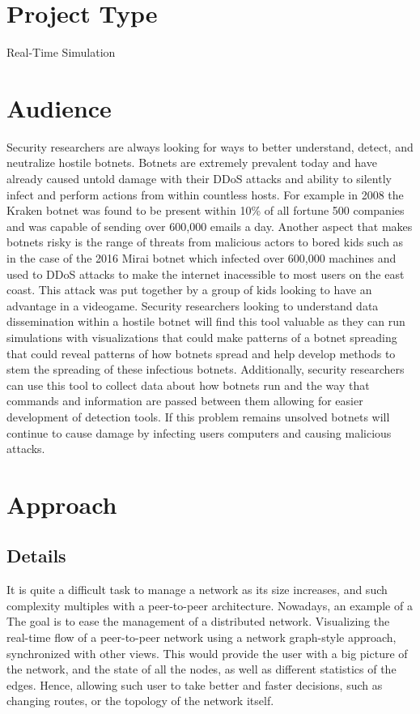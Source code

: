\documentclass{proc}
\begin{document}
\section{Project Type}
Real-Time Simulation
\section{Audience} 
Security researchers are always looking for ways to better understand, detect, and neutralize hostile botnets. Botnets are extremely prevalent today and have already caused untold damage with their DDoS attacks and ability to silently infect and perform actions from within countless hosts. For example in 2008 the Kraken botnet was found to be present within 10\% of all fortune 500 companies and was capable of sending over 600,000 emails a day. Another aspect that makes botnets risky is the range of threats from malicious actors to bored kids such as in the case of the 2016 Mirai botnet which infected over 600,000 machines and used to DDoS attacks to make the internet inacessible to most users on the east coast. This attack was put together by a group of kids looking to have an advantage in a videogame\cite{WhiteOps}. Security researchers looking to understand data dissemination within a hostile botnet will find this tool valuable as they can run simulations with visualizations that could make patterns of a botnet spreading that could reveal patterns of how botnets spread and help develop methods to stem the spreading of these infectious botnets. Additionally, security researchers can use this tool to collect data about how botnets run and  the way that commands and information are passed between them allowing for easier development of detection tools. If this problem remains unsolved botnets will continue to cause damage by infecting users computers and causing malicious attacks.

\section{Approach}
\subsection{Details}

It is quite a difficult task to manage a network as its size increases, and such complexity multiples with a peer-to-peer architecture. Nowadays, an example of a The goal is to ease the management of a distributed network. Visualizing the real-time flow of a peer-to-peer network using a network graph-style approach, synchronized with other views. This would provide the user with a big picture of the network, and the state of all the nodes, as well as different statistics of the edges. Hence, allowing such user to take better and faster decisions, such as changing routes, or the topology of the network itself.
\end{document}
